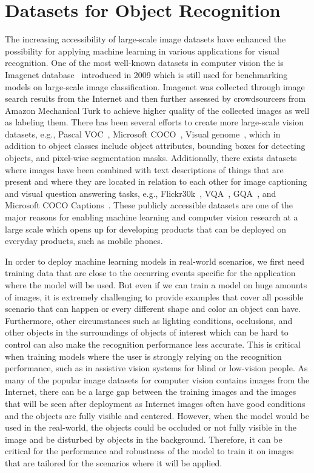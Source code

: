 \section{Datasets for Object Recognition} %
\label{sec:datasets_for_object_recognition}

The increasing accessibility of large-scale image datasets have enhanced the possibility for applying machine learning in various applications for visual recognition. One of the most well-known datasets in computer vision the is Imagenet database~\cite{deng2009imagenet} introduced in 2009 which is still used for benchmarking models on large-scale image classification. Imagenet was collected through image search results from the Internet and then further assessed by crowdsourcers from Amazon Mechanical Turk to achieve higher quality of the collected images as well as labeling them. There has been several efforts to create more large-scale vision datasets, e.g., Pascal VOC~\cite{everingham2015pascal}, Microsoft COCO~\cite{lin2014microsoft}, Visual genome~\cite{krishna2017visual}, which in addition to object classes include object attributes, bounding boxes for detecting objects, and pixel-wise segmentation masks. Additionally, there exists datasets where images have been combined with text descriptions of things that are present and where they are located in relation to each other for image captioning and visual question answering tasks, e.g., Flickr30k~\cite{young2014image}, VQA~\cite{antol2015vqa}, GQA~\cite{hudson2019gqa}, and Microsoft COCO Captions~\cite{chen2015microsoft}. These publicly accessible datasets are one of the major reasons for enabling machine learning and computer vision research at a large scale which opens up for developing products that can be deployed on everyday products, such as mobile phones. 


In order to deploy machine learning models in real-world scenarios, we first need training data that are close to the occurring events specific for the application where the model will be used. 
But even if we can train a model on huge amounts of images, it is extremely challenging to provide examples that cover all possible scenario that can happen or every different shape and color an object can have. Furthermore, other circumstances such as lighting conditions, occlusions, and other objects in the surroundings of objects of interest which can be hard to control can also make the recognition performance less accurate. This is critical when training models where the user is strongly relying on the recognition performance, such as in assistive vision systems for blind or low-vision people. As many of the popular image datasets for computer vision contains images from the Internet, there can be a large gap between the training images and the images that will be seen after deployment as Internet images often have good conditions and the objects are fully visible and centered. However, when the model would be used in the real-world, the objects could be occluded or not fully visible in the image and be disturbed by objects in the background. Therefore, it can be critical for the performance and robustness of the model to train it on images that are tailored for the scenarios where it will be applied. 

